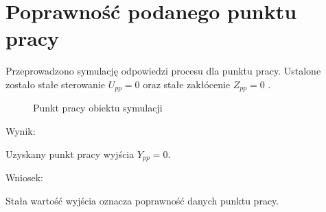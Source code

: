 \section{Poprawność podanego punktu pracy}
\label{projekt:zad1}
Przeprowadzono symulację odpowiedzi procesu dla punktu pracy. 
Ustalone zostało stałe sterowanie $U_{pp} = 0$ oraz stałe zakłócenie $Z_{pp}=0$ .

\begin{figure}[H] 
    \centering
    
    \caption{Punkt pracy obiektu symulacji}
    \label{projekt:zad1:figure:charstat_u_y_z}
\end{figure}


Wynik: 

\indent Uzyskany punkt pracy wyjścia $Y_{pp}=0$.

Wniosek: 

\indent Stała wartość wyjścia oznacza poprawność danych punktu pracy.

\newpage
